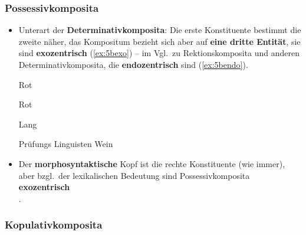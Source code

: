 \begin{frame}
\frametitle{Possessivkomposita}

\begin{itemize}
	\item Unterart der \textbf{Determinativkomposita}: Die erste Konstituente bestimmt die zweite näher, das Kompositum bezieht sich aber auf \textbf{eine dritte Entität}, sie sind \textbf{exozentrisch} (\ref{ex:5bexo}) -- im Vgl.\ zu Rektionskomposita und anderen Determinativkomposita, die \textbf{endozentrisch} sind (\ref{ex:5bendo}).
	
	\settowidth{} 
	\ea\label{ex:5bexo}
		\ea Rot 

	
		\ex Rot 
	
		\ex Lang 
		\z

	
	\ex \label{ex:5bendo}
		\ea Prüfungs 
		\ex Linguisten 
		\ex Wein 
		\z 
	\z 

\pause 

	\item Der \textbf{morphosyntaktische} Kopf ist die rechte Konstituente (wie immer), aber bzgl.\ der lexikalischen Bedeutung sind Possessivkomposita \textbf{exozentrisch}\\
	\citep[vgl.][]{Fries&MyP16j}.
	
\end{itemize}

\end{frame}


\subsubsection{Kopulativkomposita}

